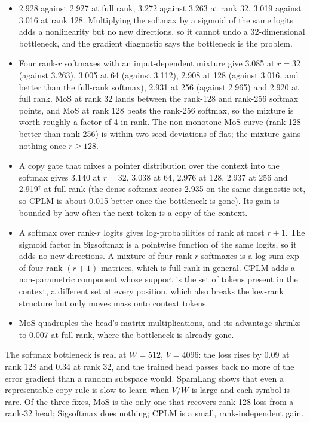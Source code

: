 \begin{itemize}
\item {} 2.928 against 2.927 at full rank, 3.272 against 3.263 at rank 32, 3.019 against 3.016 at rank 128. Multiplying the softmax by a sigmoid of the same logits adds a nonlinearity but no new directions, so it cannot undo a 32-dimensional bottleneck, and the gradient diagnostic says the bottleneck is the problem.
\item {} Four rank-$r$ softmaxes with an input-dependent mixture give 3.085 at $r=32$ (against 3.263), 3.005 at 64 (against 3.112), 2.908 at 128 (against 3.016, and better than the full-rank softmax), 2.931 at 256 (against 2.965) and 2.920 at full rank. MoS at rank 32 lands between the rank-128 and rank-256 softmax points, and MoS at rank 128 beats the rank-256 softmax, so the mixture is worth roughly a factor of 4 in rank. The non-monotone MoS curve (rank 128 better than rank 256) is within two seed deviations of flat; the mixture gains nothing once $r\ge128$.
\item {} A copy gate that mixes a pointer distribution over the context into the softmax gives 3.140 at $r=32$, 3.038 at 64, 2.976 at 128, 2.937 at 256 and 2.919$^\dagger$ at full rank (the dense softmax scores 2.935 on the same diagnostic set, so CPLM is about 0.015 better once the bottleneck is gone). Its gain is bounded by how often the next token is a copy of the context.
\item {} A softmax over rank-$r$ logits gives log-probabilities of rank at most $r+1$. The sigmoid factor in Sigsoftmax is a pointwise function of the same logits, so it adds no new directions. A mixture of four rank-$r$ softmaxes is a log-sum-exp of four rank-$(r+1)$ matrices, which is full rank in general. CPLM adds a non-parametric component whose support is the set of tokens present in the context, a different set at every position, which also breaks the low-rank structure but only moves mass onto context tokens.
\item {} MoS quadruples the head's matrix multiplications, and its advantage shrinks to 0.007 at full rank, where the bottleneck is already gone.
\end{itemize}

 The softmax bottleneck is real at $W=512$, $V=4096$: the loss rises by 0.09 at rank 128 and 0.34 at rank 32, and the trained head passes back no more of the error gradient than a random subspace would. SpamLang shows that even a representable copy rule is slow to learn when $V/W$ is large and each symbol is rare. Of the three fixes, MoS is the only one that recovers rank-128 loss from a rank-32 head; Sigsoftmax does nothing; CPLM is a small, rank-independent gain.

